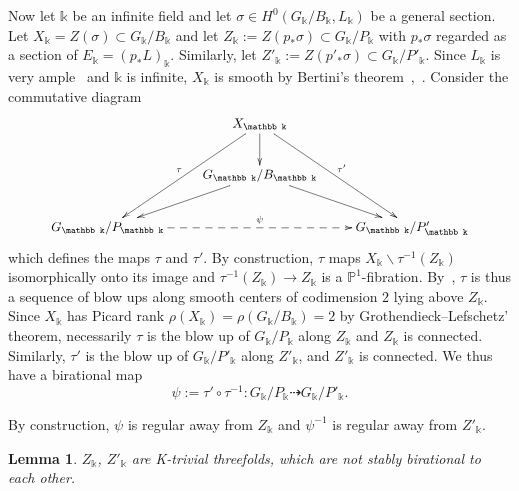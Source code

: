 \documentclass[a4paper,12pt]{amsart}
\def\k{\mathbb k}
\def\P{\mathbb P}
\theoremstyle{plain}
\newtheorem{lem}[dummy]{Lemma}
\numberwithin{equation}{section}
\theoremstyle{definition}
\newcommand{\gs}{\sigma}
\newcommand{\bss}{\backslash}
\newcommand{\cnec}{\mathrel{:=}}
\renewcommand{\(}{\left(}
\renewcommand{\)}{\right)}
\newcommand{\dto}{\dashrightarrow}
\begin{document}
Now let $\k$ be an infinite field
and let $\gs \in H^0(G_\k/B_\k,L_\k)$ be a general section. 
Let $X_\k = Z(\gs) \subset G_\k/B_\k$ and let
$Z_\k \cnec Z(p_*\gs) \subset G_\k/P_\k$ 
with $p_*\gs$
regarded as a section of $E_\k = (p_*L)_\k$.
Similarly, let $Z'_\k \cnec Z(p'_*\gs) \subset G_\k/P'_\k$.
Since $L_\k$ is very ample~\cite[Theorem 3]{RamRam} 
and $\k$ is infinite,
$X_\k$ is smooth  
by Bertini's theorem~\cite[Th\'eor\`eme 6.3]{JouanolouBertini},~\cite[Theorem 1.10]{MukaiK31820}.
Consider the commutative diagram
\begin{equation}\label{eq:G-P-diagram}
\xymatrix{
    & & X_\k \ar[ddl]_{\tau} \ar[ddr]^{\tau'}
    \ar@{->}[d] & & \\
    &  & G_\k/B_\k \ar[dl]\ar[dr] &  & \\
    & G_\k/P_\k \ar@{-->}[rr]^{\psi} 
    & & G_\k/P'_\k & 
}
\end{equation}
which defines the maps $\tau$ and $\tau'$.
By construction, 
$\tau$ maps $X_\k \bss \tau^{-1}(Z_\k)$
isomorphically onto its image
and $\tau^{-1}(Z_\k) \to Z_\k$ is a $\P^1$-fibration.
By~\cite[Theorem 2]{DanilovDecomp},
$\tau$ is thus a sequence of blow ups along smooth centers
of codimension $2$ lying above $Z_\k$.
Since $X_{\k}$ has Picard rank
$\rho(X_\k) = \rho(G_\k/B_\k) = 2$
by Grothendieck--Lefschetz' theorem,
necessarily $\tau$ is the blow up of $G_\k/P_\k$ along $Z_\k$
and $Z_\k$ is connected.
Similarly, $\tau'$ is the blow up of $G_\k/P'_\k$ along $Z'_\k$,
and $Z'_\k$ is connected.
We thus have a birational map 
$$\psi \cnec \tau' \circ \tau^{-1} : G_\k/P_\k \dto G_\k/P'_\k.$$

By construction, $\psi$ is regular away from $Z_\k$
and $\psi^{-1}$ is regular away from $Z'_\k$.

\begin{lem}\label{lem-nSBG2}
$Z_\k$, $Z'_\k$ are 
K-trivial threefolds,
which are not stably birational to each other.
\end{lem}
\end{document}
